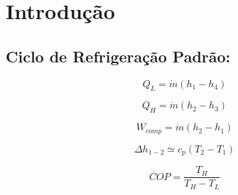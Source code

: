 \chapter{Introdução}

\section{Ciclo de Refrigeração Padrão:}

\begin{equation}
    Q_L = \dot{m}(h_1-h_4)
    \label{QL}
\end{equation}

\begin{equation}
    Q_H = \dot{m}(h_2-h_3)
    \label{QH}
\end{equation}

\begin{equation}
    W_{comp} = \dot{m}(h_2-h_1)
    \label{W compressor}
\end{equation}

\begin{equation}
    \Delta h_{1-2} \simeq  c_p (T_2-T_1)
    \label{simplificacao entalpia}
\end{equation}

\begin{equation}
    COP = \frac{T_H}{T_H - T_L}
    \label{COP carnot}
\end{equation}




